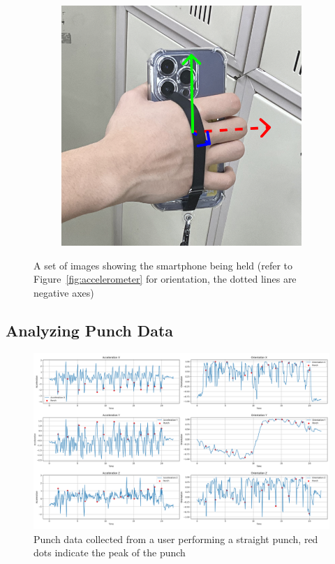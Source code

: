 \documentclass{article}
\begin{document}
\begin{figure}[h]
\begin{subfigure}{0.33\textwidth}
        \label{fig:grip_2}
    \end{subfigure}%
    \begin{subfigure}{0.33\textwidth}
        \centering
        \includegraphics[width=\textwidth]{2_3_3_3.png}
        \label{fig:grip_3}
    \end{subfigure}
    \caption{A set of images showing the smartphone being held (refer to Figure~\ref{fig:accelerometer} for orientation, the dotted lines are negative axes)}
    \label{fig:phone_grips}
\end{figure}

\FloatBarrier
\subsection{Analyzing Punch Data}

\FloatBarrier
\begin{figure}[h]
    \centering
    \includegraphics[width=\textwidth]{straight_user_input.png}
    \caption{Punch data collected from a user performing a straight punch, red dots indicate the peak of the punch}
    \label{fig:straight_user_input}
\end{figure}
\end{document}

